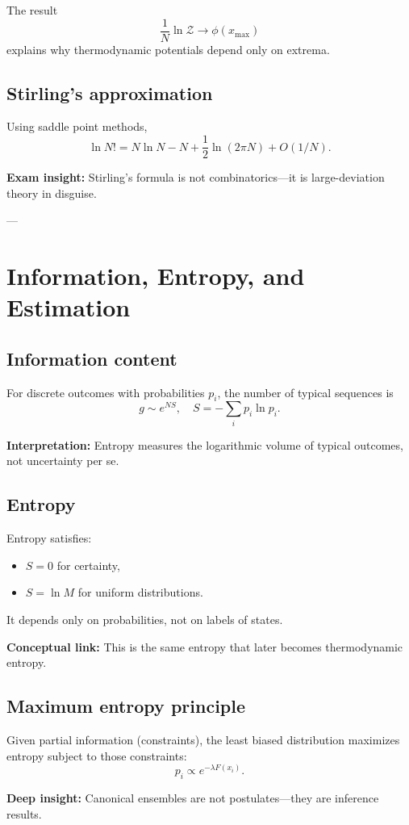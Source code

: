 \documentclass[9pt,twocoloumn]{article}
\begin{document}
The result
\[
\frac{1}{N}\ln \mathcal{Z} \to \phi(x_{\max})
\]
explains why thermodynamic potentials depend only on extrema.

\subsection*{Stirling’s approximation}
Using saddle point methods,
\[
\ln N! = N\ln N - N + \frac{1}{2}\ln(2\pi N) + O(1/N).
\]

\textbf{Exam insight:} Stirling’s formula is not combinatorics—it is large-deviation theory in disguise.

---

\section{Information, Entropy, and Estimation}

\subsection*{Information content}
For discrete outcomes with probabilities $p_i$, the number of typical sequences is
\[
g \sim e^{N S},
\quad
S = -\sum_i p_i \ln p_i.
\]

\textbf{Interpretation:} Entropy measures the logarithmic volume of typical outcomes, not uncertainty per se.

\subsection*{Entropy}
Entropy satisfies:
\begin{itemize}
\item $S=0$ for certainty,
\item $S=\ln M$ for uniform distributions.
\end{itemize}

It depends only on probabilities, not on labels of states.

\textbf{Conceptual link:} This is the same entropy that later becomes thermodynamic entropy.

\subsection*{Maximum entropy principle}
Given partial information (constraints),
the least biased distribution maximizes entropy subject to those constraints:
\[
p_i \propto e^{-\lambda F(x_i)}.
\]

\textbf{Deep insight:} Canonical ensembles are not postulates—they are inference results.
\end{document}
